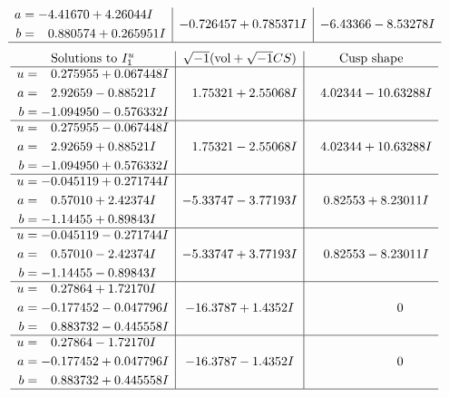 \documentclass[1p]{elsarticle_modified}
\theoremstyle{definition}
\newcommand{\I}{\sqrt{-1}}
\begin{document}
$$\begin{array}{c|c|c}
\begin{aligned}
a &= -4.41670 + 4.26044 I \\
b &= \phantom{-}0.880574 + 0.265951 I\end{aligned}
 & -0.726457 + 0.785371 I & -6.43366 - 8.53278 I\\
 \hline 
 \end{array}$$\newpage$$\begin{array}{c|c|c}  
\text{Solutions to }I^u_{1}& \I (\text{vol} + \sqrt{-1}CS) & \text{Cusp shape}\\
 \hline 
\begin{aligned}
u &= \phantom{-}0.275955 + 0.067448 I \\
a &= \phantom{-}2.92659 - 0.88521 I \\
b &= -1.094950 - 0.576332 I\end{aligned}
 & \phantom{-}1.75321 + 2.55068 I & \phantom{-}4.02344 - 10.63288 I \\ \hline\begin{aligned}
u &= \phantom{-}0.275955 - 0.067448 I \\
a &= \phantom{-}2.92659 + 0.88521 I \\
b &= -1.094950 + 0.576332 I\end{aligned}
 & \phantom{-}1.75321 - 2.55068 I & \phantom{-}4.02344 + 10.63288 I \\ \hline\begin{aligned}
u &= -0.045119 + 0.271744 I \\
a &= \phantom{-}0.57010 + 2.42374 I \\
b &= -1.14455 + 0.89843 I\end{aligned}
 & -5.33747 - 3.77193 I & \phantom{-}0.82553 + 8.23011 I \\ \hline\begin{aligned}
u &= -0.045119 - 0.271744 I \\
a &= \phantom{-}0.57010 - 2.42374 I \\
b &= -1.14455 - 0.89843 I\end{aligned}
 & -5.33747 + 3.77193 I & \phantom{-}0.82553 - 8.23011 I \\ \hline\begin{aligned}
u &= \phantom{-}0.27864 + 1.72170 I \\
a &= -0.177452 - 0.047796 I \\
b &= \phantom{-}0.883732 - 0.445558 I\end{aligned}
 & -16.3787 + 1.4352 I & \phantom{-0.000000 } 0 \\ \hline\begin{aligned}
u &= \phantom{-}0.27864 - 1.72170 I \\
a &= -0.177452 + 0.047796 I \\
b &= \phantom{-}0.883732 + 0.445558 I\end{aligned}
 & -16.3787 - 1.4352 I & \phantom{-0.000000 } 0\\
 \hline 
 \end{array}$$\newpage\newpage\renewcommand{\arraystretch}{1}
\end{document}
